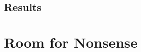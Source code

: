 \documentclass[a4paper,11pt]{article}
\begin{document}
\subsection{Results}
\label{sec:evaluation:results}


\section{Room for Nonsense}
\label{sec:nonsense}


\newpage
\printbibliography
\end{document}
